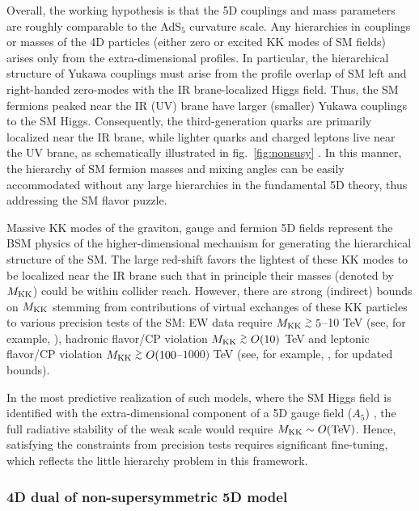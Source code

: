 \documentclass[a4paper,12pt]{article}
\newcommand{\gsim}{\stackrel{>}{_\sim}}
\def\fig#1{fig.~\ref{#1}}
\def\fig#1{fig.~\ref{#1}}
\begin{document}
Overall, the working hypothesis is that the 5D couplings and mass parameters are roughly comparable 
to the AdS$_5$ curvature scale. Any hierarchies in couplings or masses of the 4D particles (either zero or excited KK modes of SM fields)
arises only from the extra-dimensional profiles. In particular, the hierarchical structure of Yukawa couplings
must arise from the profile overlap of SM left and right-handed zero-modes with the IR brane-localized Higgs field. 
 Thus, the 
 SM fermions peaked near the IR (UV) brane have larger (smaller) Yukawa couplings to the SM Higgs.
 Consequently, the third-generation quarks are primarily localized near the IR brane, while lighter quarks and charged leptons live near the UV brane, as schematically illustrated in \fig{fig:nonsusy} \cite{Gherghetta:2000qt}. 
In this manner, the hierarchy of SM fermion masses and mixing angles can be easily accommodated without any large hierarchies in the fundamental 5D theory, thus addressing the SM flavor puzzle.

Massive KK modes of the graviton, gauge and fermion 5D fields represent the BSM physics of the higher-dimensional mechanism for generating the hierarchical structure of the SM.
The large red-shift favors the lightest of these KK modes to be localized near the IR brane such that in principle their masses (denoted by $M_{ \rm KK }$) could be within collider reach.
However, there are strong (indirect) bounds on $M_{ \rm KK }$ stemming from contributions of virtual exchanges of these KK particles to various precision tests of the SM: EW data require $M_{ \rm KK } \gsim 5$--10 TeV (see, for example, \cite{Davoudiasl:2009cd}), hadronic flavor/CP violation $M_{ \rm KK }\gsim O(10)$ TeV and leptonic flavor/CP violation $M_{ \rm KK } \gsim O(100$--$1000)$ TeV (see, for example, \cite{Glioti:2024hye}, for updated
bounds).

In the most predictive realization of such models, where the SM Higgs field is identified with the extra-dimensional component of a 5D gauge field ($A_5$) \cite{Contino:2003ve,Agashe:2004rs}, the full radiative stability of the weak scale would require $M_{ \rm KK } \sim O( \hbox{TeV} )$.
Hence, satisfying the constraints from precision tests requires significant fine-tuning, which 
reflects the little hierarchy problem in this framework.

\subsubsection*{4D dual of non-supersymmetric 5D model}
\end{document}
